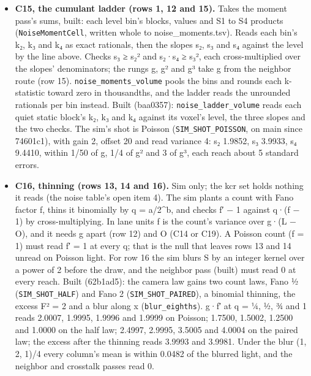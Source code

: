 \begin{enumerate}
\begin{itemize}
\item \textbf{C15, the cumulant ladder (rows 1, 12 and 15).} Takes the moment pass's sums, built: each level bin's blocks, values and S1 to S4 products (\texttt{Noise\allowbreak{}Moment\allowbreak{}Cell}, written whole to noise\_\allowbreak{}moments.tsv). Reads each bin's k₂, k₃ and k₄ as exact rationals, then the slopes s₂, s₃ and s₄ against the level by the line above. Checks s₃ ≥ s₂² and s₂·s₄ ≥ s₃², each cross-multiplied over the slopes' denominators; the rungs g, g² and g³ take g from the neighbor route (row 15). \texttt{noise\_\allowbreak{}moments\_\allowbreak{}volume} pools the bins and rounds each k-statistic toward zero in thousandths, and the ladder reads the unrounded rationals per bin instead. Built (baa0357): \texttt{noise\_\allowbreak{}ladder\_\allowbreak{}volume} reads each quiet static block's k₂, k₃ and k₄ against its voxel's level, the three slopes and the two checks. The sim's shot is Poisson (\texttt{SIM\_\allowbreak{}SHOT\_\allowbreak{}POISSON}, on main since 74601c1), with gain 2, offset 20 and read variance 4: s₂ 1.9852, s₃ 3.9933, s₄ 9.4410, within 1/50 of g, 1/4 of g² and 3 of g³, each reach about 5 standard errors.
\item \textbf{C16, thinning (rows 13, 14 and 16).} Sim only; the kcr set holds nothing it reads (the noise table's open item 4). The sim plants a count with Fano factor f, thins it binomially by q = a/2\textasciicircum{}b, and checks f′ − 1 against q·(f − 1) by cross-multiplying. In lane units f is the count's variance over g·(L − O), and it needs g apart (row 12) and O (C14 or C19). A Poisson count (f = 1) must read f′ = 1 at every q; that is the null that leaves rows 13 and 14 unread on Poisson light. For row 16 the sim blurs S by an integer kernel over a power of 2 before the draw, and the neighbor pass (built) must read 0 at every reach. Built (62b1ad5): the camera law gains two count laws, Fano ½ (\texttt{SIM\_\allowbreak{}SHOT\_\allowbreak{}HALF}) and Fano 2 (\texttt{SIM\_\allowbreak{}SHOT\_\allowbreak{}PAIRED}), a binomial thinning, the excess F² = 2 and a blur along x (\texttt{blur\_\allowbreak{}eighths}). g·f′ at q = ¼, ½, ¾ and 1 reads 2.0007, 1.9995, 1.9996 and 1.9999 on Poisson; 1.7500, 1.5002, 1.2500 and 1.0000 on the half law; 2.4997, 2.9995, 3.5005 and 4.0004 on the paired law; the excess after the thinning reads 3.9993 and 3.9981. Under the blur (1, 2, 1)/4 every column's mean is within 0.0482 of the blurred light, and the neighbor and crosstalk passes read 0.

\end{itemize}
\end{enumerate}
